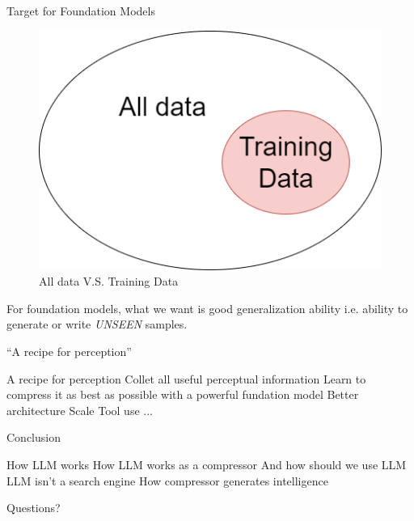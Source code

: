 \documentclass[scheme=plain]{ctexbeamer}
\begin{document}
\begin{frame}{Target for Foundation Models}
  \begin{figure}
    \includegraphics[width=.6\linewidth]{target_for_foundation_models.drawio.png}
    \caption{All data V.S. Training Data}
  \end{figure}
  \begin{outline}
    \1 For foundation models, what we want is good generalization ability
      \2 i.e. ability to generate or write \emph{UNSEEN} samples.
  \end{outline}
\end{frame}

\begin{frame}{``A recipe for perception''}
  \begin{outline}
    \0 A recipe for perception
      \1 Collet all useful perceptual information
      \1 Learn to compress it as best as possible with a powerful fundation model
        \2 Better architecture
        \2 Scale
        \2 Tool use
        \2 ...
  \end{outline}
\end{frame}


\begin{frame}{Conclusion}
  \begin{outline}
    \1 How LLM works
    \1 How LLM works as a compressor
      \2 And how should we use LLM
      \2 LLM isn't a search engine
    \1 How compressor generates intelligence
  \end{outline}
\end{frame}

\begin{frame}[standout]
  Questions?
\end{frame}
\end{document}
